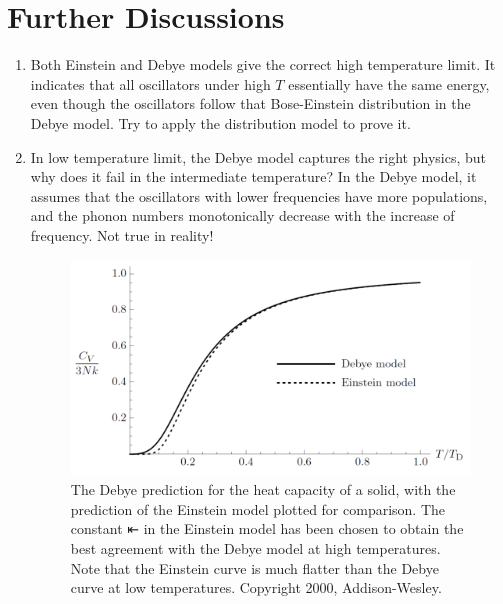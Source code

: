 \section{Further Discussions}
\begin{enumerate}
\item{Both Einstein and Debye models give the correct high temperature limit. It indicates that all oscillators under high $T$ essentially have the same energy, even though the oscillators follow that Bose-Einstein distribution in the Debye model. Try to apply the distribution model to prove it.}
\item{In low temperature limit, the Debye model captures the right physics, but why does it fail in the intermediate temperature? In the Debye model, it assumes that the
oscillators with lower frequencies have more populations, and the phonon numbers monotonically decrease with the increase of frequency. Not true in reality!}


\begin{figure}[h]
\centering
\includegraphics[width=0.9\linewidth]{imgs/Debye.png}
\caption{The Debye prediction for the heat capacity of a solid, with the
prediction of the Einstein model plotted for comparison. The constant ⇤ in the
Einstein model has been chosen to obtain the best agreement with the Debye
model at high temperatures. Note that the Einstein curve is much flatter than the Debye curve at low temperatures. Copyright 2000, Addison-Wesley. }
\end{figure}

\end{enumerate}



